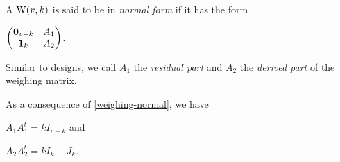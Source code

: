 \documentclass[../../../main]{subfiles}
\begin{document}
 \begin{defin}
  A $\text{W}(v,k)$ is said to be in {\it normal form} if it has the form
  \begin{defenum}
   \item\label{weighing-normal} $\begin{pmatrix} \mathbf{0}_{v-k} & A_1 \\ \mathbf{1}_k & A_2 \end{pmatrix}$.
  \end{defenum}
  Similar to designs, we call $A_1$ the {\it residual part} and $A_2$ the {\it derived part} of the weighing matrix.
  
  As a consequence of \ref{weighing-normal}, we have
  \begin{defenum}[resume]
  \item\label{weighing-residual} $A_1A_1^t=kI_{v-k}$ and
  \item\label{weighing-derived} $A_2A_2^t = kI_k-J_k$.
  \end{defenum}
 \end{defin}
 
 \biblio
\end{document}
